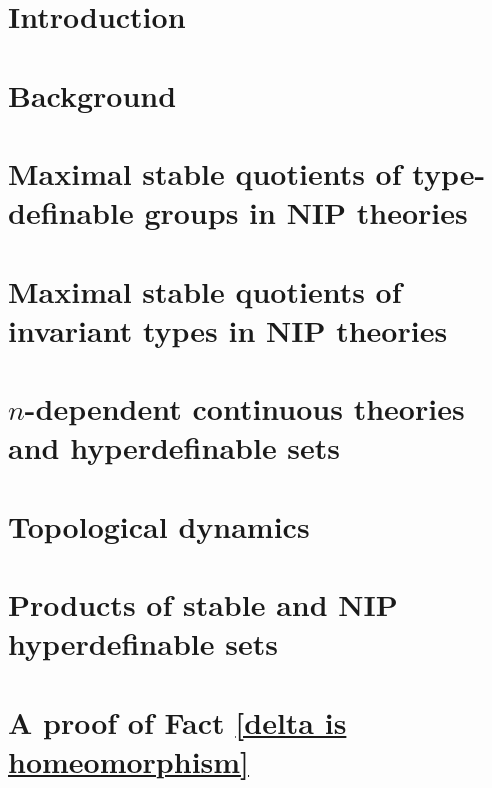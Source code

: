 \documentclass[11pt]{report}
\newtheorem{external claim}[teor]{Claim}
\begin{document}
\tableofcontents





\chapter{Introduction}


\chapter{Background} \label{Chapter 2}


\chapter{Maximal stable quotients of type-definable groups in NIP theories}\label{Chapter 3}


\chapter{Maximal stable quotients of invariant types in NIP theories} \label{Chapter 4}


\chapter{$n$-dependent continuous theories and hyperdefinable sets}\label{Chapter 5}


\chapter{Topological dynamics}\label{Chapter 6}


\appendix
\chapter{Products of stable and NIP hyperdefinable sets}

\chapter{A proof of Fact \ref{delta is homeomorphism}}\label{AppendixB}

\singlespacing
\printbibliography
\end{document}
